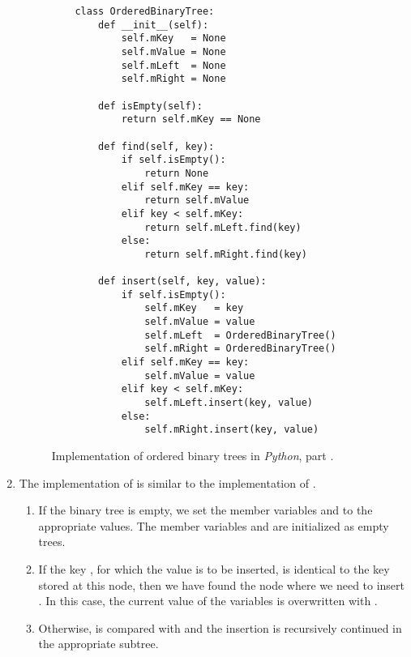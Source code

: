 \begin{enumerate}
\begin{figure}[!ht]
  \centering
\begin{verbatim}
    class OrderedBinaryTree:
        def __init__(self):
            self.mKey   = None
            self.mValue = None
            self.mLeft  = None
            self.mRight = None
    
        def isEmpty(self):
            return self.mKey == None
    
        def find(self, key):
            if self.isEmpty():
                return None
            elif self.mKey == key:
                return self.mValue
            elif key < self.mKey:
                return self.mLeft.find(key)
            else:
                return self.mRight.find(key)
    
        def insert(self, key, value):
            if self.isEmpty():
                self.mKey   = key
                self.mValue = value
                self.mLeft  = OrderedBinaryTree()
                self.mRight = OrderedBinaryTree()
            elif self.mKey == key:
                self.mValue = value
            elif key < self.mKey:
                self.mLeft.insert(key, value)
            else:
                self.mRight.insert(key, value)
\end{verbatim}
\vspace*{-0.3cm}
  \caption{Implementation of ordered binary trees in \textsl{Python}, part .}
  \label{fig:binary-tree.py-1}
\end{figure}
\item The implementation of  is similar to the implementation of .
      \begin{enumerate}
      \item If the binary tree is empty, we set the member variables  and
             to the appropriate values.  The member variables  and 
             are initialized as empty trees.
      \item If the key , for which the value  is to be inserted, is identical
            to the key  stored at this node, then we have found the node where we need
            to insert .  In this case, the current value of the variables  is
            overwritten with . 
      \item Otherwise,  is compared with  and the insertion is recursively continued in the
            appropriate subtree.
      \end{enumerate}      



\end{enumerate}

